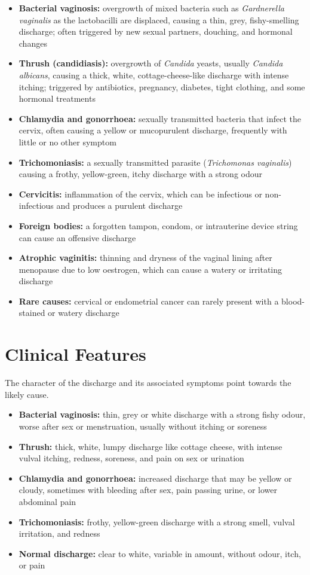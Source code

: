 \begin{itemize}
    \item \textbf{Bacterial vaginosis:} overgrowth of mixed bacteria such as \textit{Gardnerella vaginalis} as the lactobacilli are displaced, causing a thin, grey, fishy-smelling discharge; often triggered by new sexual partners, douching, and hormonal changes
    \item \textbf{Thrush (candidiasis):} overgrowth of \textit{Candida} yeasts, usually \textit{Candida albicans}, causing a thick, white, cottage-cheese-like discharge with intense itching; triggered by antibiotics, pregnancy, diabetes, tight clothing, and some hormonal treatments
    \item \textbf{Chlamydia and gonorrhoea:} sexually transmitted bacteria that infect the cervix, often causing a yellow or mucopurulent discharge, frequently with little or no other symptom
    \item \textbf{Trichomoniasis:} a sexually transmitted parasite (\textit{Trichomonas vaginalis}) causing a frothy, yellow-green, itchy discharge with a strong odour
    \item \textbf{Cervicitis:} inflammation of the cervix, which can be infectious or non-infectious and produces a purulent discharge
    \item \textbf{Foreign bodies:} a forgotten tampon, condom, or intrauterine device string can cause an offensive discharge
    \item \textbf{Atrophic vaginitis:} thinning and dryness of the vaginal lining after menopause due to low oestrogen, which can cause a watery or irritating discharge
    \item \textbf{Rare causes:} cervical or endometrial cancer can rarely present with a blood-stained or watery discharge
\end{itemize}

\section*{Clinical Features}
The character of the discharge and its associated symptoms point towards the likely cause.

\begin{itemize}
    \item \textbf{Bacterial vaginosis:} thin, grey or white discharge with a strong fishy odour, worse after sex or menstruation, usually without itching or soreness
    \item \textbf{Thrush:} thick, white, lumpy discharge like cottage cheese, with intense vulval itching, redness, soreness, and pain on sex or urination
    \item \textbf{Chlamydia and gonorrhoea:} increased discharge that may be yellow or cloudy, sometimes with bleeding after sex, pain passing urine, or lower abdominal pain
    \item \textbf{Trichomoniasis:} frothy, yellow-green discharge with a strong smell, vulval irritation, and redness
    \item \textbf{Normal discharge:} clear to white, variable in amount, without odour, itch, or pain
\end{itemize}

